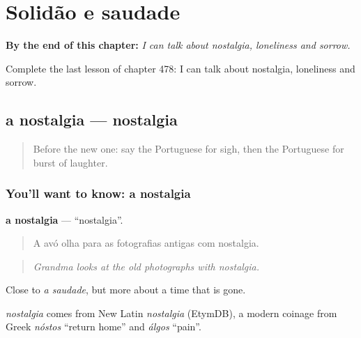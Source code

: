 
\chapter{Solidão e saudade}
\label{ch:pt-solidao-e-saudade}

\begin{chapteropening}
\textbf{By the end of this chapter:} \emph{I can talk about nostalgia, loneliness and sorrow.}

Complete the last lesson of chapter 478: I can talk about nostalgia, loneliness and sorrow.
\end{chapteropening}

\section[a nostalgia]{a nostalgia — nostalgia}

\label{lesson:PT-C478-nostalgia}



\begin{quote}
Before the new one: say the Portuguese for sigh, then the Portuguese for burst of laughter.
\end{quote}

\subsection*{You'll want to know: a nostalgia}
\textbf{a nostalgia} — \textquotedblleft{}nostalgia\textquotedblright{}.

\begin{quote}
A avó olha para as fotografias antigas com nostalgia.
\end{quote}

\begin{quote}
\emph{Grandma looks at the old photographs with nostalgia.}
\end{quote}

Close to \emph{a saudade}, but more about a time that is gone.

\begin{cousinweb}
\emph{nostalgia} comes from New Latin \emph{nostalgia} (EtymDB), a modern coinage from Greek \emph{nóstos} \textquotedblleft{}return home\textquotedblright{} and \emph{álgos} \textquotedblleft{}pain\textquotedblright{}.
\end{cousinweb}

